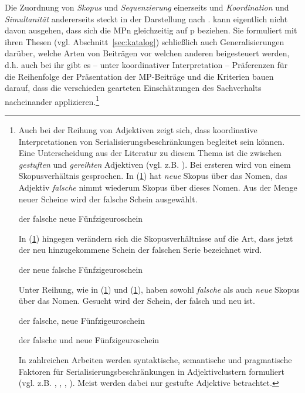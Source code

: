 Die Zuordnung von \textit{Skopus} und \textit{Sequenzierung} einerseits und \textit{Koordination} und \textit{Simultanität} andererseits steckt in der Darstellung nach \citet{Lindner1991}. \citet{Thurmair1989, Thurmair1991} kann eigentlich nicht davon ausgehen, dass sich die MPn glei\-chzeitig auf p beziehen. Sie formuliert mit ihren Thesen (vgl. Abschnitt~\ref{sec:katalog}) schließlich auch Generalisierungen darüber, welche Arten von Beiträgen vor welchen anderen beigesteuert werden, d.h. auch bei ihr gibt es – unter koordinativer Interpretation – Präferenzen für die Reihenfolge der Präsentation der MP-Beiträge und die Kriterien bauen darauf, dass die verschieden gearteten Einschätzungen des Sachverhalts nacheinander applizieren.\footnote{Auch bei der Reihung von Adjektiven zeigt sich, dass koordinative Interpretationen von Se\-rialisierungsbeschränkungen begleitet sein können. Eine Unterscheidung aus der Literatur zu diesem Thema ist die zwischen \textit{gestuften} und \textit{gereihten} Adjektiven (vgl. z.B. \citealt[348-350]{Trost2006}). Bei ersteren wird von einem Skopusverhältnis gesprochen. In (\ref{xyz}) hat \textit{neue} Skopus über das Nomen, das Adjektiv \textit{falsche} nimmt wiederum Skopus über dieses Nomen. Aus der Menge neuer Scheine wird der falsche Schein ausgewählt.

\begin{exe}
	\ex\label{xyz} 
	der falsche neue Fünfzigeuroschein
	\hfill\hbox{\citet[438]{Trost2006}}
\end{exe}
In (\ref{abc}) hingegen verändern sich die Skopusverhältnisse auf die Art, dass jetzt der neu hinzugekommene Schein der falschen Serie bezeichnet wird.

\begin{exe}
	\ex\label{abc} 
	der neue falsche Fünfzigeuroschein
	\hfill\hbox{\citet[349]{Trost2006}}
\end{exe}
Unter Reihung, wie in (\ref{ghj}) und (\ref{jkl}), haben sowohl \textit{falsche} als auch \textit{neue} Skopus über das Nomen. Gesucht wird der Schein, der falsch und neu ist.

\begin{exe}
	\ex\label{ghj} 
	der falsche, neue Fünfzigeuroschein
\end{exe}
\vspace{-0.65cm}
\begin{exe}
	\ex\label{jkl} 
	der falsche und neue Fünfzigeuroschein
	\hfill\hbox{\citet[349]{Trost2006}}
\end{exe}
In zahlreichen Arbeiten werden syntaktische, semantische und pragmatische Faktoren für Serialisierungsbeschränkungen in Adjektivclustern formuliert (vgl. z.B. \citealt{Posner1980}, \citealt{Eichinger1991}, \citealt{Trost2006}, \citealt{Eroms2011}). Meist werden dabei nur gestufte Adjektive betrachtet. 

}

